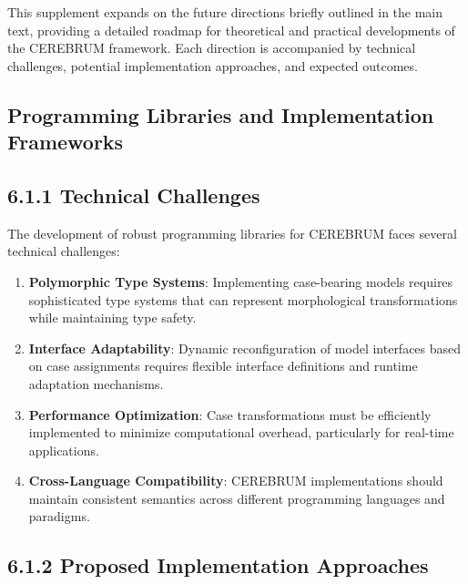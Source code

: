 \documentclass[
  11pt,
  letterpaper,
]{article}
\providecommand{\tightlist}{%
  \setlength{\itemsep}{0pt}\setlength{\parskip}{0pt}}
\begin{document}
This supplement expands on the future directions briefly outlined in the
main text, providing a detailed roadmap for theoretical and practical
developments of the CEREBRUM framework. Each direction is accompanied by
technical challenges, potential implementation approaches, and expected
outcomes.

\hypertarget{programming-libraries-and-implementation-frameworks}{%
\subsection{Programming Libraries and Implementation
Frameworks}\label{programming-libraries-and-implementation-frameworks}}

\hypertarget{technical-challenges}{%
\subsection{6.1.1 Technical Challenges}\label{technical-challenges}}

The development of robust programming libraries for CEREBRUM faces
several technical challenges:

\begin{enumerate}
\def\labelenumi{\arabic{enumi}.}
\tightlist
\item
  \textbf{Polymorphic Type Systems}: Implementing case-bearing models
  requires sophisticated type systems that can represent morphological
  transformations while maintaining type safety.
\item
  \textbf{Interface Adaptability}: Dynamic reconfiguration of model
  interfaces based on case assignments requires flexible interface
  definitions and runtime adaptation mechanisms.
\item
  \textbf{Performance Optimization}: Case transformations must be
  efficiently implemented to minimize computational overhead,
  particularly for real-time applications.
\item
  \textbf{Cross-Language Compatibility}: CEREBRUM implementations should
  maintain consistent semantics across different programming languages
  and paradigms.
\end{enumerate}

\hypertarget{proposed-implementation-approaches}{%
\subsection{6.1.2 Proposed Implementation
Approaches}\label{proposed-implementation-approaches}}
\end{document}

